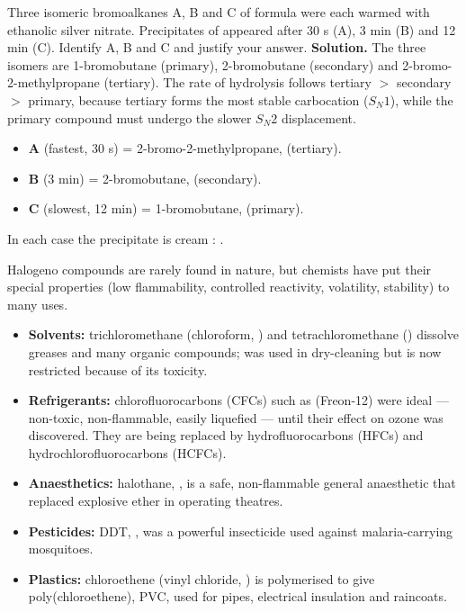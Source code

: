 \documentclass[11pt]{article}
\newcommand{\cle}[1]{{\popxbold\color{popdark}#1}}
\newcounter{popsec}
\newcounter{popsub}
\newcommand{\courssub}[1]{%
  \stepcounter{popsub}%
  \par\vspace{9pt}\noindent{\popxbold\fontsize{11.5}{13}\selectfont\color{popink}{\color{poporange}\thepopsec.\thepopsub}\hspace{6pt}#1}\par\nopagebreak\vspace{4pt}
}
\begin{document}
\begin{exoresolu}
Three isomeric bromoalkanes A, B and C of formula  were each warmed with ethanolic silver nitrate. Precipitates of  appeared after 30 s (A), 3 min (B) and 12 min (C). Identify A, B and C and justify your answer.
\tcblower
\textbf{Solution.} The three isomers are 1-bromobutane (primary), 2-bromobutane (secondary) and 2-bromo-2-methylpropane (tertiary). The rate of hydrolysis follows tertiary $>$ secondary $>$ primary, because tertiary forms the most stable carbocation ($S_N1$), while the primary compound must undergo the slower $S_N2$ displacement.
\begin{itemize}
\item \textbf{A} (fastest, 30 s) = 2-bromo-2-methylpropane,  (tertiary).
\item \textbf{B} (3 min) = 2-bromobutane,  (secondary).
\item \textbf{C} (slowest, 12 min) = 1-bromobutane,  (primary).
\end{itemize}
In each case the precipitate is cream : .
\end{exoresolu}

\courssub{Uses of Halogeno Compounds}

Halogeno compounds are rarely found in nature, but chemists have put their special properties (low flammability, controlled reactivity, volatility, stability) to many uses.

\begin{aretenir}
\begin{itemize}
\item \textbf{Solvents:} trichloromethane (chloroform, ) and tetrachloromethane () dissolve greases and many organic compounds;  was used in dry-cleaning but is now restricted because of its toxicity.
\item \textbf{Refrigerants:} chlorofluorocarbons (CFCs) such as  (Freon-12) were ideal --- non-toxic, non-flammable, easily liquefied --- until their effect on ozone was discovered. They are being replaced by hydrofluorocarbons (HFCs) and hydrochlorofluorocarbons (HCFCs).
\item \textbf{Anaesthetics:} halothane, , is a safe, non-flammable general anaesthetic that replaced explosive ether in operating theatres.
\item \textbf{Pesticides:} DDT, , was a powerful insecticide used against malaria-carrying mosquitoes.
\item \textbf{Plastics:} chloroethene (vinyl chloride, ) is polymerised to give poly(chloroethene), \cle{PVC}, used for pipes, electrical insulation and raincoats.
\end{itemize}
\end{aretenir}
\end{document}
